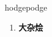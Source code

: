 
\begin{frame}
{\huge hodgepodge}
\begin{center}
\begin{enumerate}\Large
  \item \textbf{大杂烩}
\end{enumerate}
\end{center}
\end{frame}
